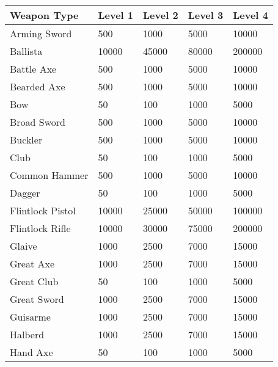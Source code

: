 \begin{longtable}{l | p{1.75cm} | p{1.75cm} | p{1.75cm} | p{1.75cm}}
	Weapon Type & Level 1 & Level 2 & Level 3 & Level 4\\ \hline
	
	Arming Sword & 500 & 1000 & 5000 & 10000\\
	
	Ballista & 10000 & 45000 & 80000 & 200000 \\
	
	Battle Axe & 500 & 1000 & 5000 & 10000\\
	
	Bearded Axe & 500 & 1000 & 5000 & 10000\\
	
	Bow & 50 & 100 & 1000 & 5000\\
	
	Broad Sword & 500 & 1000 & 5000 & 10000\\
	
	Buckler & 500 & 1000 & 5000 & 10000\\
	
	Club & 50 & 100 & 1000 & 5000\\
	
	Common Hammer & 500 & 1000 & 5000 & 10000\\
	
	Dagger & 50 & 100 & 1000 & 5000\\
	
	Flintlock Pistol & 10000 & 25000 & 50000 & 100000\\
	
	Flintlock Rifle & 10000 & 30000 & 75000 & 200000\\
	
	Glaive & 1000 & 2500 & 7000 & 15000 \\
	
	Great Axe & 1000 & 2500 & 7000 & 15000 \\
	
	Great Club & 50 & 100 & 1000 & 5000\\
	
	Great Sword & 1000 & 2500 & 7000 & 15000 \\
	
	Guisarme & 1000 & 2500 & 7000 & 15000 \\
	
	Halberd & 1000 & 2500 & 7000 & 15000 \\
	
	Hand Axe & 50 & 100 & 1000 & 5000\\
	

\end{longtable}
